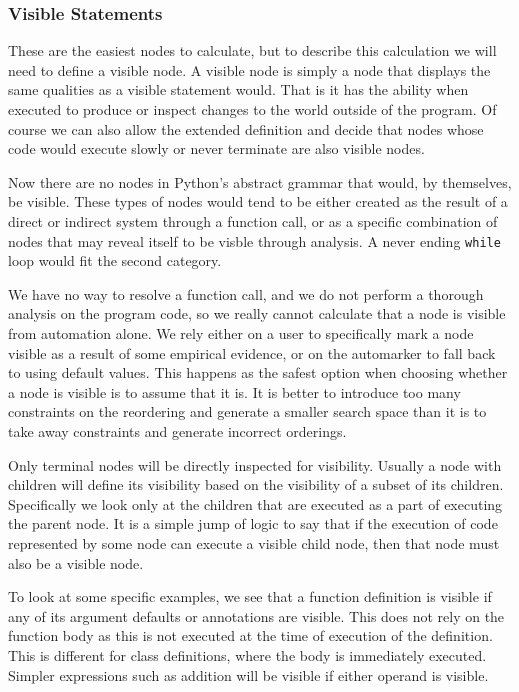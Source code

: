 \documentclass[twoside,a4paper]{report}
\begin{document}
\subsubsection{Visible Statements}

These are the easiest nodes to calculate, but to describe this calculation we will need to define a visible node. A visible node is simply a node
that displays the same qualities as a visible statement would. That is it has the ability when executed to produce or inspect changes to the world
outside of the program. Of course we can also allow the extended definition and decide that nodes whose code would execute slowly or never terminate
are also visible nodes.

Now there are no nodes in Python's abstract grammar that would, by themselves, be visible. These types of nodes would tend to be either created as the
result of a direct or indirect system through a function call, or as a specific combination of nodes that may reveal itself to be visble through analysis.
A never ending \texttt{while} loop would fit the second category.

We have no way to resolve a function call, and we do not perform a thorough analysis on the program code, so we really cannot calculate that a node is
visible from automation alone. We rely either on a user to specifically mark a node visible as a result of some empirical evidence, or on the automarker
to fall back to using default values. This happens as the safest option when choosing whether a node is visible is to assume that it is. It is better to
introduce too many constraints on the reordering and generate a smaller search space than it is to take away constraints and generate incorrect orderings.

Only terminal nodes will be directly inspected for visibility. Usually a node with children will define its visibility based on the visibility of a subset
of its children. Specifically we look only at the children that are executed as a part of executing the parent node. It is a simple jump of logic to say
that if the execution of code represented by some node can execute a visible child node, then that node must also be a visible node.

To look at some specific examples, we see that a function definition is visible if any of its argument defaults or annotations are visible. This does not
rely on the function body as this is not executed at the time of execution of the definition. This is different for class definitions, where the body is
immediately executed. Simpler expressions such as addition will be visible if either operand is visible.
\end{document}
